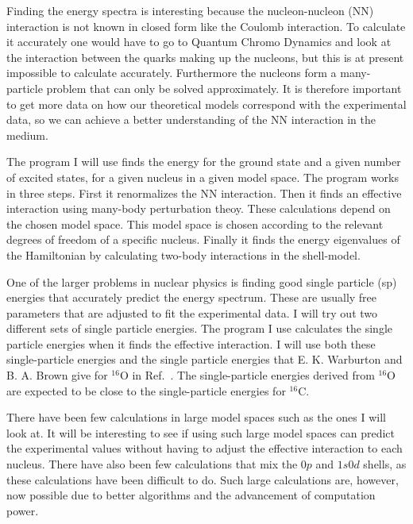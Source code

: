 Finding the energy spectra is interesting because the nucleon-nucleon (NN)
interaction is not known in closed form like the Coulomb interaction. To
calculate it accurately one would have to go to Quantum Chromo Dynamics and
look at the interaction between the quarks making up the nucleons, but this is
at present impossible to calculate accurately. Furthermore the nucleons form a
many-particle problem that can only be solved approximately. It is therefore
important to get more data on how our theoretical models correspond with the
experimental data, so we can achieve a better understanding of the NN
interaction in the medium.

The program I will use finds the energy for the ground state and a given 
number of  excited states, for a given nucleus in a given model space.
The program works in three steps. First it renormalizes the NN interaction.
Then it finds an effective interaction using many-body perturbation theoy. These
calculations depend on the chosen model space. This model space is chosen
according to the relevant degrees of freedom of a specific nucleus. Finally it
finds the energy eigenvalues of the Hamiltonian by calculating two-body
interactions in the shell-model.

One of the larger problems in nuclear physics is finding good single particle
(sp) energies that accurately predict the energy spectrum. These are usually
free parameters that are adjusted to fit the experimental data. I will try out
two different sets of single particle energies. The program I use calculates
the single particle energies when it finds the effective interaction. I will
use both these single-particle energies and the single particle energies that E. K. Warburton and B. A.
Brown give for $^{16}$O in Ref.~\citep{brown}. The single-particle energies derived from  $^{16}$O
are expected to be close to the single-particle energies for $^{16}$C.

There have been few calculations in large model spaces such as the ones I will
look at. It will be interesting to see if using such large model spaces can
predict the experimental values without having to adjust the effective
interaction to each nucleus. There have also been few calculations that mix the
$0p$ and $1s0d$ shells, as these calculations have been difficult to do. Such
large calculations are, however, now possible due to better algorithms and the
advancement of computation power.

